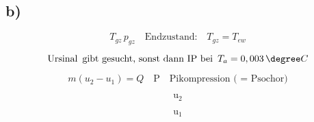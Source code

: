 

\subsection*{b)}

\[
T_{gz} \, p_{gz} \quad \text{Endzustand:} \quad T_{gz} = T_{ew}
\]

\[
\text{Ursinal } \, \text{gibt gesucht, sonst dann IP bei } \, T_a = 0,003 \, \degree C
\]

\[
m (u_2 - u_1) = Q \quad \text{P} \quad \text{Pikompression ( = Psochor)}
\]

\[
\text{u}_2
\]

\[
\text{u}_1
\]